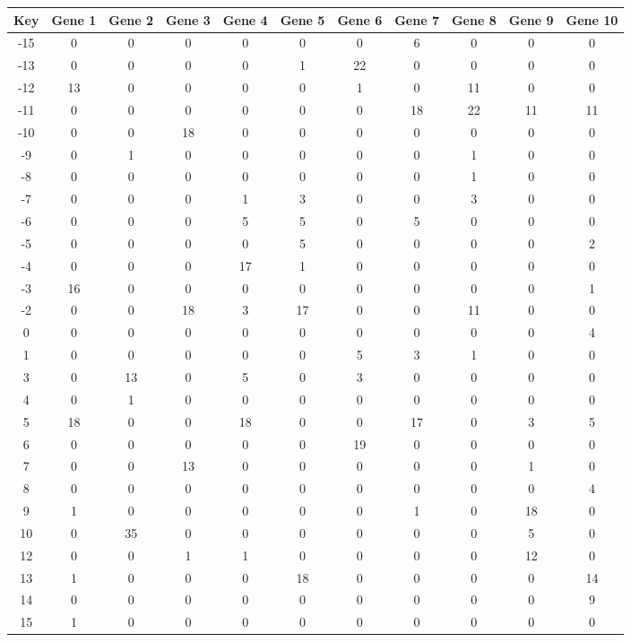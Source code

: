 \begin{tabular}{|c|c|c|c|c|c|c|c|c|c|c|}
\hline
Key & Gene 1 & Gene 2 & Gene 3 & Gene 4 & Gene 5 & Gene 6 & Gene 7 & Gene 8 & Gene 9 & Gene 10 \\
\hline
-15 & 0 & 0 & 0 & 0 & 0 & 0 & 6 & 0 & 0 & 0 \\
-13 & 0 & 0 & 0 & 0 & 1 & 22 & 0 & 0 & 0 & 0 \\
-12 & 13 & 0 & 0 & 0 & 0 & 1 & 0 & 11 & 0 & 0 \\
-11 & 0 & 0 & 0 & 0 & 0 & 0 & 18 & 22 & 11 & 11 \\
-10 & 0 & 0 & 18 & 0 & 0 & 0 & 0 & 0 & 0 & 0 \\
-9 & 0 & 1 & 0 & 0 & 0 & 0 & 0 & 1 & 0 & 0 \\
-8 & 0 & 0 & 0 & 0 & 0 & 0 & 0 & 1 & 0 & 0 \\
-7 & 0 & 0 & 0 & 1 & 3 & 0 & 0 & 3 & 0 & 0 \\
-6 & 0 & 0 & 0 & 5 & 5 & 0 & 5 & 0 & 0 & 0 \\
-5 & 0 & 0 & 0 & 0 & 5 & 0 & 0 & 0 & 0 & 2 \\
-4 & 0 & 0 & 0 & 17 & 1 & 0 & 0 & 0 & 0 & 0 \\
-3 & 16 & 0 & 0 & 0 & 0 & 0 & 0 & 0 & 0 & 1 \\
-2 & 0 & 0 & 18 & 3 & 17 & 0 & 0 & 11 & 0 & 0 \\
0 & 0 & 0 & 0 & 0 & 0 & 0 & 0 & 0 & 0 & 4 \\
1 & 0 & 0 & 0 & 0 & 0 & 5 & 3 & 1 & 0 & 0 \\
3 & 0 & 13 & 0 & 5 & 0 & 3 & 0 & 0 & 0 & 0 \\
4 & 0 & 1 & 0 & 0 & 0 & 0 & 0 & 0 & 0 & 0 \\
5 & 18 & 0 & 0 & 18 & 0 & 0 & 17 & 0 & 3 & 5 \\
6 & 0 & 0 & 0 & 0 & 0 & 19 & 0 & 0 & 0 & 0 \\
7 & 0 & 0 & 13 & 0 & 0 & 0 & 0 & 0 & 1 & 0 \\
8 & 0 & 0 & 0 & 0 & 0 & 0 & 0 & 0 & 0 & 4 \\
9 & 1 & 0 & 0 & 0 & 0 & 0 & 1 & 0 & 18 & 0 \\
10 & 0 & 35 & 0 & 0 & 0 & 0 & 0 & 0 & 5 & 0 \\
12 & 0 & 0 & 1 & 1 & 0 & 0 & 0 & 0 & 12 & 0 \\
13 & 1 & 0 & 0 & 0 & 18 & 0 & 0 & 0 & 0 & 14 \\
14 & 0 & 0 & 0 & 0 & 0 & 0 & 0 & 0 & 0 & 9 \\
15 & 1 & 0 & 0 & 0 & 0 & 0 & 0 & 0 & 0 & 0 \\
\hline
\end{tabular}